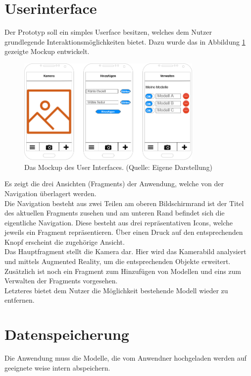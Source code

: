 \section{Userinterface}
Der Prototyp soll ein simples Userface besitzen, welches dem Nutzer grundlegende Interaktionsmöglichkeiten bietet. Dazu wurde das in Abbildung \ref{fig:ui-mockup} gezeigte Mockup entwickelt.
\begin{figure}[h!]
\centering
\includegraphics[width=0.8\textwidth]{Abbildungen/ui-mockup.png}
\caption[UI Mockup]{Das Mockup des User Interfaces. (Quelle: Eigene Darstellung)}
\label{fig:ui-mockup}
\end{figure}
Es zeigt die drei Ansichten (Fragments) der Anwendung, welche von der Navigation überlagert werden. \\
Die Navigation besteht aus zwei Teilen am oberen Bildschirmrand ist der Titel des aktuellen Fragments zusehen und am unteren Rand befindet sich die eigentliche Navigation. Diese besteht aus drei repräsentativen Icons, welche jeweils ein Fragment repräsentieren. Über einen Druck auf den entsprechenden Knopf erscheint die zugehörige Ansicht.\\
Das Hauptfragment stellt die Kamera dar. Hier wird das Kamerabild analysiert und mittels Augmented Reality, um die entsprechenden Objekte erweitert. Zusätzlich ist noch ein Fragment zum Hinzufügen von Modellen und eins zum Verwalten der Fragments vorgesehen.\\
Letzteres bietet dem Nutzer die Möglichkeit bestehende Modell wieder zu entfernen.

\section{Datenspeicherung}
Die Anwendung muss die Modelle, die vom Anwendner hochgeladen werden auf geeignete weise intern abspeichern.



